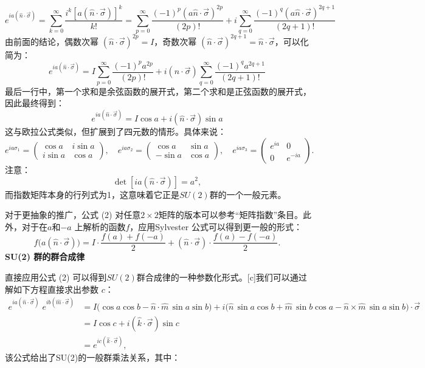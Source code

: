 $$
e^{ia(\hat{n} \cdot \vec{\sigma})}
= \sum_{k=0}^{\infty} \frac{i^k [a (\hat{n} \cdot \vec{\sigma})]^k}{k!}
= \sum_{p=0}^{\infty} \frac{(-1)^p (a \hat{n} \cdot \vec{\sigma})^{2p}}{(2p)!}
+ i \sum_{q=0}^{\infty} \frac{(-1)^q (a \hat{n} \cdot \vec{\sigma})^{2q+1}}{(2q+1)!}~
$$
由前面的结论，偶数次幂 $(\hat{n} \cdot \vec{\sigma})^{2p} = I$，奇数次幂 $(\hat{n} \cdot \vec{\sigma})^{2q+1} = \hat{n} \cdot \vec{\sigma}$，可以化简为：
$$
e^{ia(\hat{n} \cdot \vec{\sigma})}
= I \sum_{p=0}^{\infty} \frac{(-1)^p a^{2p}}{(2p)!}
+ i (\hat{n} \cdot \vec{\sigma}) \sum_{q=0}^{\infty} \frac{(-1)^q a^{2q+1}}{(2q+1)!}~
$$
最后一行中，第一个求和是余弦函数的展开式，第二个求和是正弦函数的展开式，因此最终得到：
$$
e^{ia(\hat{n} \cdot \vec{\sigma})}
= I \cos a
+ i (\hat{n} \cdot \vec{\sigma}) \sin a~
$$
这与欧拉公式类似，但扩展到了四元数的情形。具体来说：
$$
e^{ia\sigma_{1}}
= 
\begin{pmatrix}
\cos a & i\sin a \\
i\sin a & \cos a
\end{pmatrix},
\quad
e^{ia\sigma_{2}}
= 
\begin{pmatrix}
\cos a & \sin a \\
-\sin a & \cos a
\end{pmatrix},
\quad
e^{ia\sigma_{3}}
= 
\begin{pmatrix}
e^{ia} & 0 \\
0 & e^{-ia}
\end{pmatrix}.~
$$
注意：
$$
\det[ia(\hat{n}\cdot\vec{\sigma})] = a^2,~
$$
而指数矩阵本身的行列式为1，这意味着它正是$SU(2)$群的一个一般元素。

对于更抽象的推广，公式 (2) 对任意$2\times2$矩阵的版本可以参考“矩阵指数”条目。此外，对于在$a$和$-a$ 上解析的函数$f$，应用Sylvester 公式可以得到更一般的形式：
$$
f\big(a(\hat{n}\cdot\vec{\sigma})\big)
= 
I \cdot \frac{f(a) + f(-a)}{2}
+
(\hat{n}\cdot\vec{\sigma}) \cdot \frac{f(a) - f(-a)}{2}.~
$$
\textbf{SU(2) 群的群合成律}

直接应用公式 (2) 可以得到$SU(2)$群合成律的一种参数化形式。[c]我们可以通过解如下方程直接求出参数 $c$：
$$
\begin{aligned}
e^{ia(\hat{n}\cdot\vec{\sigma})} \; e^{ib(\hat{m}\cdot\vec{\sigma})}
&= I\big(\cos a\cos b - \hat{n}\cdot\hat{m}\,\sin a \sin b\big)+ i\big(\hat{n}\,\sin a \cos b + \hat{m}\,\sin b \cos a - \hat{n}\times\hat{m}\,\sin a \sin b\big)\cdot\vec{\sigma} \\
&= I\cos c + i(\hat{k}\cdot\vec{\sigma})\sin c \\
&= e^{ic(\hat{k}\cdot\vec{\sigma})},
\end{aligned}~
$$
该公式给出了SU(2)的一般群乘法关系，其中：

